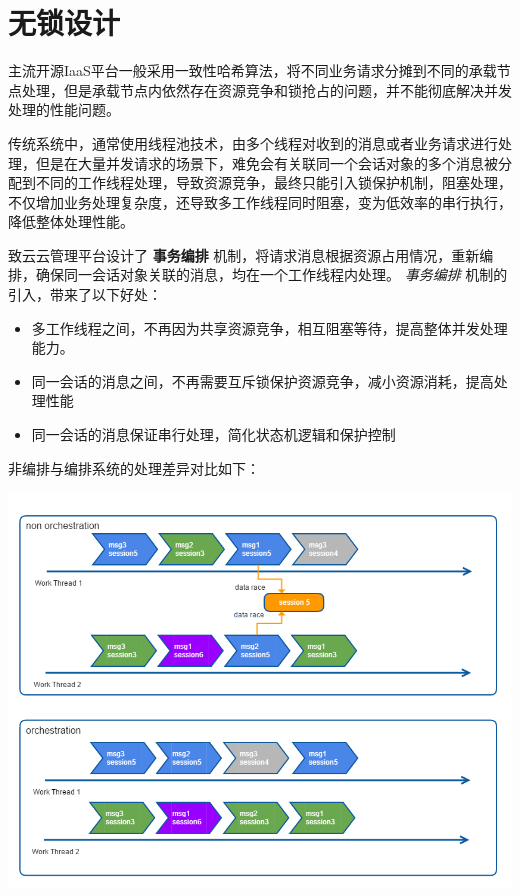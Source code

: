 \documentclass[letterpaper,10pt]{sphinxmanual}
\begin{document}
\section{无锁设计}
\label{index:id10}
主流开源IaaS平台一般采用一致性哈希算法，将不同业务请求分摊到不同的承载节点处理，但是承载节点内依然存在资源竞争和锁抢占的问题，并不能彻底解决并发处理的性能问题。

传统系统中，通常使用线程池技术，由多个线程对收到的消息或者业务请求进行处理，但是在大量并发请求的场景下，难免会有关联同一个会话对象的多个消息被分配到不同的工作线程处理，导致资源竞争，最终只能引入锁保护机制，阻塞处理，不仅增加业务处理复杂度，还导致多工作线程同时阻塞，变为低效率的串行执行，降低整体处理性能。

致云云管理平台设计了 \textbf{事务编排} 机制，将请求消息根据资源占用情况，重新编排，确保同一会话对象关联的消息，均在一个工作线程内处理。 \emph{事务编排} 机制的引入，带来了以下好处：
\begin{itemize}
\item {} 
多工作线程之间，不再因为共享资源竞争，相互阻塞等待，提高整体并发处理能力。

\item {} 
同一会话的消息之间，不再需要互斥锁保护资源竞争，减小资源消耗，提高处理性能

\item {} 
同一会话的消息保证串行处理，简化状态机逻辑和保护控制

\end{itemize}

非编排与编排系统的处理差异对比如下：

\includegraphics{2_2_1_transaction_orchestration.png}
\end{document}
